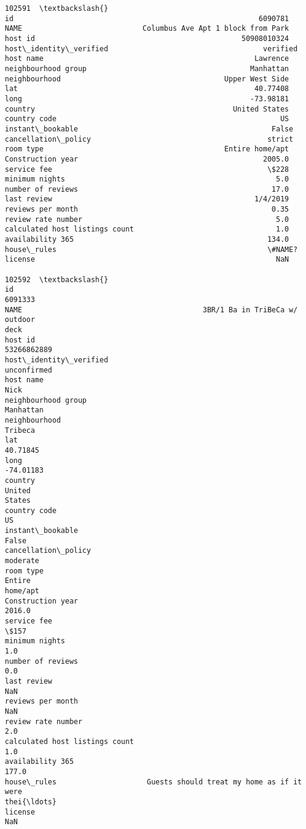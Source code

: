\documentclass[11pt]{article}
\begin{document}
\begin{tcolorbox}[breakable, size=fbox, boxrule=.5pt, pad at break*=1mm, opacityfill=0]
\begin{Verbatim}[commandchars=\\\{\}]
                                                            102591  \textbackslash{}
id                                                         6090781
NAME                            Columbus Ave Apt 1 block from Park
host id                                                50908010324
host\_identity\_verified                                    verified
host name                                                 Lawrence
neighbourhood group                                      Manhattan
neighbourhood                                      Upper West Side
lat                                                       40.77408
long                                                     -73.98181
country                                              United States
country code                                                    US
instant\_bookable                                             False
cancellation\_policy                                         strict
room type                                          Entire home/apt
Construction year                                           2005.0
service fee                                                  \$228
minimum nights                                                 5.0
number of reviews                                             17.0
last review                                               1/4/2019
reviews per month                                             0.35
review rate number                                             5.0
calculated host listings count                                 1.0
availability 365                                             134.0
house\_rules                                                 \#NAME?
license                                                        NaN

102592  \textbackslash{}
id
6091333
NAME                                          3BR/1 Ba in TriBeCa w/ outdoor
deck
host id
53266862889
host\_identity\_verified
unconfirmed
host name
Nick
neighbourhood group
Manhattan
neighbourhood
Tribeca
lat
40.71845
long
-74.01183
country                                                             United
States
country code
US
instant\_bookable
False
cancellation\_policy
moderate
room type                                                         Entire
home/apt
Construction year
2016.0
service fee                                                                 \$157
minimum nights
1.0
number of reviews
0.0
last review
NaN
reviews per month
NaN
review rate number
2.0
calculated host listings count
1.0
availability 365
177.0
house\_rules                     Guests should treat my home as if it were
thei{\ldots}
license
NaN


\end{Verbatim}
\end{tcolorbox}
\end{document}
